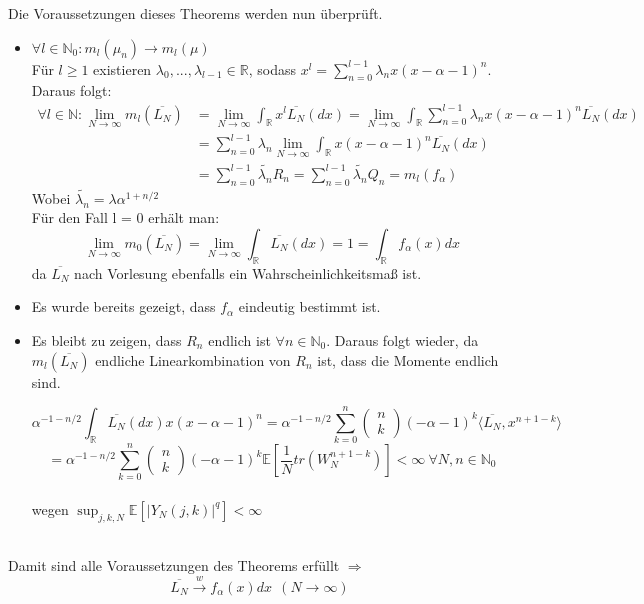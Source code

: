 \documentclass[a4paper, 11pt]{scrreprt}
\newcommand{\RR}{\mathbb{R}}
\newcommand{\EE}{\mathbb{E}}
\newcommand{\NN}{\mathbb{N}}
\newcommand{\student}[1]{\marginnote{{\normalfont\bf #1}}}
\begin{document}
Die Voraussetzungen dieses Theorems werden nun überprüft.
\begin{itemize}
\item $ \forall l \in \NN_0: m_l(\mu_n) \to m_l(\mu) $\\
Für $l \geq 1$ existieren $\lambda_0,...,\lambda_{l-1} \in \RR$, sodass $x^l = \sum_{n=0}^{l-1} \lambda_n x (x-\alpha-1)^n$. Daraus folgt:
\begin{align*}
\forall l \in \NN: \lim_{N \to \infty} m_l(\overline{L_{N}}) 
&= \lim_{N \to \infty} \int_\RR x^l \overline{L_{N}}(dx)
= \lim_{N \to \infty} \int_\RR \sum_{n=0}^{l-1} \lambda_n x (x-\alpha-1)^n \overline{L_{N}}(dx) \\
&= \sum_{n=0}^{l-1} \lambda_n \lim_{N \to \infty} \int_\RR x (x-\alpha-1)^n \overline{L_{N}}(dx) \\
&= \sum_{n=0}^{l-1} \tilde{\lambda_n} R_n
= \sum_{n=0}^{l-1} \tilde{\lambda_n} Q_n = m_l(f_\alpha)
\end{align*}
Wobei $ \tilde{\lambda_n}= \lambda \alpha ^{1+n/2}$\\

Für den Fall l = 0 erhält man:
\[\lim_{N \to \infty} m_0(\overline{L_{N}}) 
= \lim_{N \to \infty} \int_\RR \overline{L_{N}}(dx) = 1 
= \int_\RR f_\alpha(x)dx\]
da $ \overline{L_N} $ nach Vorlesung ebenfalls ein Wahrscheinlichkeitsmaß ist.

\item Es wurde bereits gezeigt, dass $ f_\alpha $ eindeutig bestimmt ist. 
\student{Manuela}
\item Es bleibt zu zeigen, dass $ R_n $ endlich ist $ \forall n \in \NN_0 $. Daraus folgt wieder, da $ m_l(\overline{L_N}) $ endliche Linearkombination von $R_n$ ist, dass die Momente endlich sind.

 \[ \alpha^{-1-n/2} \int_{\RR}\overline{L_{N}}(dx)x(x-\alpha-1)^{n} = \alpha^{-1-n/2}\sum_{k=0}^n \begin{pmatrix} n\\k\end{pmatrix} (-\alpha -1)^k \langle \overline{L_N}, x^{n+1-k} \rangle \] 
\[= \alpha^{-1-n/2}\sum_{k=0}^n \begin{pmatrix} n\\k\end{pmatrix} (-\alpha -1)^k \EE [\dfrac{1}{N} tr(W_N^{n+1-k})]
< \infty ~\forall N,n \in \NN_0 \]\\
wegen $ \sup_{j,k,N} \EE[\vert Y_N(j,k)\vert ^{q}]< \infty$ \\\\
\end{itemize}
Damit sind alle Voraussetzungen des Theorems erfüllt $ \Rightarrow $  \[ \overline{L_N} \overset{w}{\rightarrow} f_\alpha (x)dx~~(N \to \infty) \]
\end{document}

